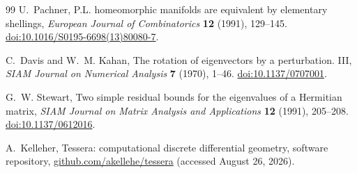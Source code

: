 \documentclass[11pt]{article}
\numberwithin{equation}{section}
\theoremstyle{definition}
\theoremstyle{remark}
\begin{document}
\begin{thebibliography}{99}
U.~Pachner,
\newblock P.L. homeomorphic manifolds are equivalent by elementary shellings,
\newblock \emph{European Journal of Combinatorics} \textbf{12} (1991),
  129--145.
\newblock \href{https://doi.org/10.1016/S0195-6698(13)80080-7}
  {doi:10.1016/S0195-6698(13)80080-7}.

C.~Davis and W.~M. Kahan,
\newblock The rotation of eigenvectors by a perturbation. III,
\newblock \emph{SIAM Journal on Numerical Analysis} \textbf{7} (1970), 1--46.
\newblock \href{https://doi.org/10.1137/0707001}{doi:10.1137/0707001}.

G.~W. Stewart,
\newblock Two simple residual bounds for the eigenvalues of a Hermitian matrix,
\newblock \emph{SIAM Journal on Matrix Analysis and Applications} \textbf{12}
  (1991), 205--208.
\newblock \href{https://doi.org/10.1137/0612016}{doi:10.1137/0612016}.

A.~Kelleher,
\newblock Tessera: computational discrete differential geometry,
\newblock software repository,
  \href{https://github.com/akellehe/tessera}{github.com/akellehe/tessera}
  (accessed August 26, 2026).

\end{thebibliography}
\end{document}
